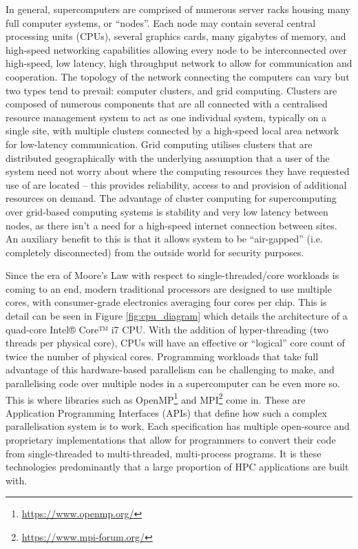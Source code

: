 \documentclass[conference]{IEEEtran}
\begin{document}
In general, supercomputers are comprised of numerous server racks housing many full computer systems, or ``nodes''. Each node may contain several central processing units (CPUs), several graphics cards, many gigabytes of memory, and high-speed networking capabilities allowing every node to be interconnected over high-speed, low latency, high throughput network to allow for communication and cooperation. The topology of the network connecting the computers can vary but two types tend to prevail: computer clusters, and grid computing. Clusters are composed of numerous components that are all connected with a centralised resource management system to act as one individual system, typically on a single site, with multiple clusters connected by a high-speed local area network for low-latency communication. Grid computing utilises clusters that are distributed geographically with the underlying assumption that a user of the system need not worry about where the computing resources they have requested use of are located – this provides reliability, access to and provision of additional resources on demand. The advantage of cluster computing for supercomputing over grid-based computing systems is stability and very low latency between nodes, as there isn’t a need for a high-speed internet connection between sites. An auxiliary benefit to this is that it allows system to be ``air-gapped'' (i.e. completely disconnected) from the outside world for security purposes.

Since the era of Moore’s Law with respect to single-threaded/core workloads is coming to an end\cite{mooreslaw}, modern traditional processors are designed to use multiple cores, with consumer-grade electronics averaging four cores per chip. This is detail can be seen in Figure \ref{fig:cpu_diagram} which details the architecture of a quad-core Intel® Core™ i7 CPU. With the addition of hyper-threading (two threads per physical core), CPUs will have an effective or ``logical” core count of twice the number of physical cores. Programming workloads that take full advantage of this hardware-based parallelism can be challenging to make, and parallelising code over multiple nodes in a supercomputer can be even more so. This is where libraries such as OpenMP\footnote{\url{https://www.openmp.org/}} and MPI\footnote{\url{https://www.mpi-forum.org/}} come in. These are Application Programming Interfaces (APIs) that define how such a complex parallelisation system is to work. Each specification has multiple open-source and proprietary implementations that allow for programmers to convert their code from single-threaded to multi-threaded, multi-process programs. It is these technologies predominantly that a large proportion of HPC applications are built with.
\end{document}
